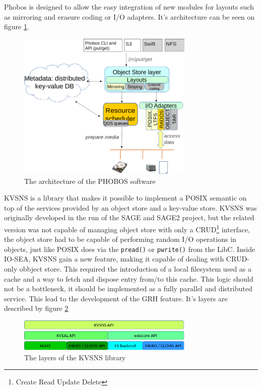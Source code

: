 Phobos is designed to allow the easy integration of new modules for layouts such as mirroring and erasure coding
or I/O adapters. It's architecture can be seen on figure \ref{fig:phobos}. 

\begin{figure}[H]
    \centering
    \includegraphics[width=0.75\textwidth]{FIGS/phobos.png}
    \caption[PHOBOS architecture]{ The architecture of the PHOBOS software}
    \label{fig:phobos}
\end{figure}

KVSNS is a library that makes it possible to implement a POSIX semantic on top of the services provided by an
object store and a key-value store. KVSNS was originally developed in the run of the SAGE and SAGE2 project, but
the related version was not capable of managing object store with only a CRUD\footnote{Create Read Update Delete}
interface, the object store had to be capable of performing random I/O operations in objects, just like POSIX
does via the \verb|pread()| or \verb|pwrite()| from the LibC. Inside IO-SEA, KVSNS gain a new feature, making it
capable of dealing with CRUD-only obbject store. This required the introduction of a local filesystem used as
a cache and a way to fetch and dispose entry from/to this cache. This logic should not be a bottleneck, it should
be implemented as a fully parallel and distributed service. This lead to the development of the GRH feature.
It's layers are described by figure \ref{fig:kvsns}

\begin{figure}[H]
    \centering
    \includegraphics[width=0.75\textwidth]{FIGS/KVSNS_architecture.png}
    \caption[KVSNS layers]{ The layers of the KVSNS library}
    \label{fig:kvsns}
\end{figure}

